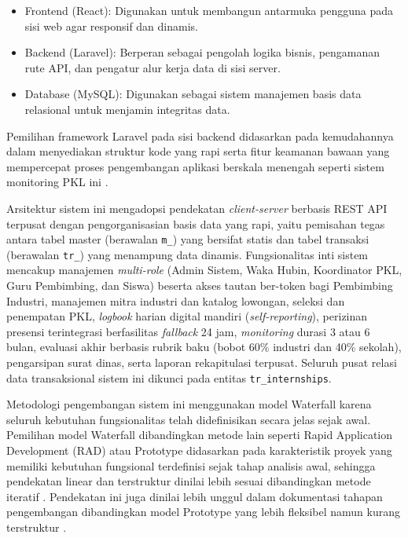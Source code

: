 \begin{itemize}
\item Frontend (React): Digunakan untuk membangun antarmuka pengguna pada sisi web agar responsif dan dinamis.
\item Backend (Laravel): Berperan sebagai pengolah logika bisnis, pengamanan rute API, dan pengatur alur kerja data di sisi server.
\item Database (MySQL): Digunakan sebagai sistem manajemen basis data relasional untuk menjamin integritas data.
\end{itemize}

Pemilihan framework Laravel pada sisi backend didasarkan pada kemudahannya dalam menyediakan struktur kode yang rapi serta fitur keamanan bawaan yang mempercepat proses pengembangan aplikasi berskala menengah seperti sistem monitoring PKL ini \cite{ref1}.

Arsitektur sistem ini mengadopsi pendekatan \textit{client-server} berbasis REST API terpusat dengan pengorganisasian basis data yang rapi, yaitu pemisahan tegas antara tabel master (berawalan \texttt{m\_}) yang bersifat statis dan tabel transaksi (berawalan \texttt{tr\_}) yang menampung data dinamis. Fungsionalitas inti sistem mencakup manajemen \textit{multi-role} (Admin Sistem, Waka Hubin, Koordinator PKL, Guru Pembimbing, dan Siswa) beserta akses tautan ber-token bagi Pembimbing Industri, manajemen mitra industri dan katalog lowongan, seleksi dan penempatan PKL, \textit{logbook} harian digital mandiri (\textit{self-reporting}), perizinan presensi terintegrasi berfasilitas \textit{fallback} 24 jam, \textit{monitoring} durasi 3 atau 6 bulan, evaluasi akhir berbasis rubrik baku (bobot 60\% industri dan 40\% sekolah), pengarsipan surat dinas, serta laporan rekapitulasi terpusat. Seluruh pusat relasi data transaksional sistem ini dikunci pada entitas \texttt{tr\_internships}.

Metodologi pengembangan sistem ini menggunakan model Waterfall karena seluruh kebutuhan fungsionalitas telah didefinisikan secara jelas sejak awal. Pemilihan model Waterfall dibandingkan metode lain seperti Rapid Application Development (RAD) atau Prototype didasarkan pada karakteristik proyek yang memiliki kebutuhan fungsional terdefinisi sejak tahap analisis awal, sehingga pendekatan linear dan terstruktur dinilai lebih sesuai dibandingkan metode iteratif \cite{ref2}. Pendekatan ini juga dinilai lebih unggul dalam dokumentasi tahapan pengembangan dibandingkan model Prototype yang lebih fleksibel namun kurang terstruktur \cite{ref3}.

